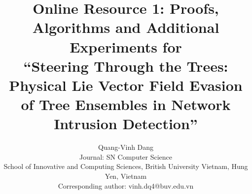 \documentclass[12pt]{article}
\title{Online Resource 1: Proofs, Algorithms and Additional Experiments for\\ ``Steering Through the Trees: Physical Lie Vector Field Evasion of Tree Ensembles in Network Intrusion Detection''}
\author{Quang-Vinh Dang\\[2pt]
\small Journal: SN Computer Science\\
\small School of Innovative and Computing Sciences, British University Vietnam, Hung Yen, Vietnam\\
\small Corresponding author: vinh.dq4@buv.edu.vn}
\date{}
\begin{document}
\sloppy
\maketitle


\end{document}
